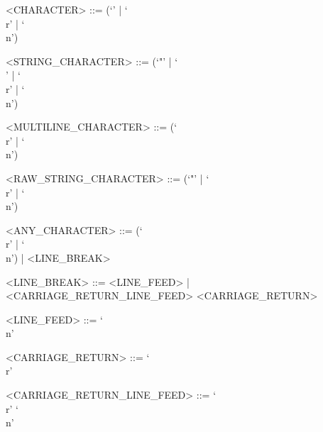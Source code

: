 \documentclass[makeidx]{article}
\begin{document}
\begin{grammar}
<CHARACTER> ::= \gtilde(`\sq' | `\\r' | `\\n')

<STRING\_CHARACTER> ::= \gtilde(`"' | `\\' | `\\r' | `\\n')

<MULTILINE\_CHARACTER> ::= \gtilde(`\\r' | `\\n')

<RAW\_STRING\_CHARACTER> ::= \gtilde(`"' | `\\r' | `\\n')

<ANY\_CHARACTER> ::= \gtilde(`\\r' | `\\n') | <LINE\_BREAK>

<LINE\_BREAK> ::= <LINE\_FEED> | <CARRIAGE\_RETURN\_LINE\_FEED>
  \alt <CARRIAGE\_RETURN>

<LINE\_FEED> ::= `\\n'

<CARRIAGE\_RETURN> ::= `\\r'

<CARRIAGE\_RETURN\_LINE\_FEED> ::= `\\r' `\\n'
\end{grammar}


\printindex
\end{document}
